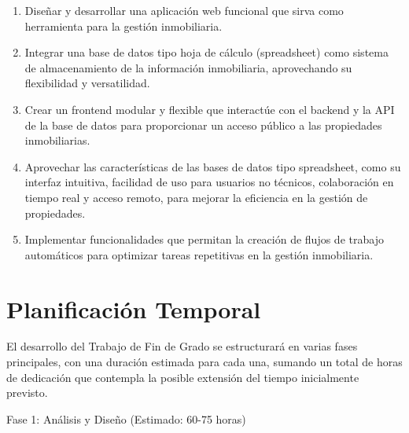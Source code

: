\begin{enumerate}

    \item Diseñar y desarrollar una aplicación web funcional que sirva como herramienta para la gestión inmobiliaria.

    \item Integrar una base de datos tipo hoja de cálculo (spreadsheet) como sistema de almacenamiento de la información inmobiliaria, aprovechando su flexibilidad y versatilidad.

    \item Crear un frontend modular y flexible que interactúe con el backend y la API de la base de datos para proporcionar un acceso público a las propiedades inmobiliarias.

    \item Aprovechar las características de las bases de datos tipo spreadsheet, como su interfaz intuitiva, facilidad de uso para usuarios no técnicos, colaboración en tiempo real y acceso remoto, para mejorar la eficiencia en la gestión de propiedades.

    \item Implementar funcionalidades que permitan la creación de flujos de trabajo automáticos para optimizar tareas repetitivas en la gestión inmobiliaria.

\end{enumerate}


\section{Planificación Temporal}


El desarrollo del Trabajo de Fin de Grado se estructurará en varias fases principales, con una duración estimada para cada una, sumando un total de horas de dedicación que contempla la posible extensión del tiempo inicialmente previsto.

Fase 1: Análisis y Diseño (Estimado: 60-75 horas)

